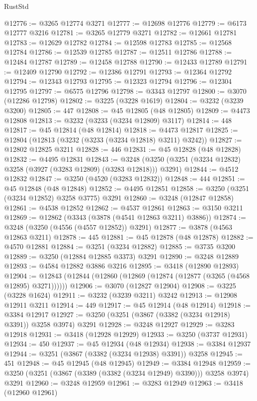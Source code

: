 \begin{lexlean}{RustStd}
\begin{coremodule}
@12776 := @3265 @12774 @3271
@12777 := @12698 @12776
@12779 := @6173 @12777 @3216
@12781 := @3265 @12779 @3271
@12782 := @12661 @12781
@12783 := @12629 @12782
@12784 := @12598 @12783
@12785 := @12568 @12784
@12786 := @12539 @12785
@12787 := @12511 @12786
@12788 := @12484 @12787
@12789 := @12458 @12788
@12790 := @12433 @12789
@12791 := @12409 @12790
@12792 := @12386 @12791
@12793 := @12364 @12792
@12794 := @12343 @12793
@12795 := @12323 @12794
@12796 := @12304 @12795
@12797 := @6575 @12796
@12798 := @3343 @12797
@12800 := @3070 (@12286 @12798)
@12802 := @3225 (@3228 @1619)
@12804 := @3232 (@3239 @3200)
@12805 := 447
@12808 := @45 @12805 (@48 @12805)
@12809 := @4473 @12808
@12813 := @3232 (@3233 (@3234 @12809) @3117)
@12814 := 448
@12817 := @45 @12814 (@48 @12814)
@12818 := @4473 @12817
@12825 := @12804 (@12813 (@3232 (@3233 (@3234 @12818) @3211) @3242))
@12827 := @12802 @12825 @3211
@12828 := 446
@12831 := @45 @12828 (@48 @12828)
@12832 := @4495 @12831
@12843 := @3248 (@3250 (@3251 (@3234 @12832) @3258 (@3927 (@3283 @12809) (@3283 @12818))) @3291)
@12844 := @4512 @12832
@12847 := @3250 (@4520 (@3283 @12832))
@12848 := 444
@12851 := @45 @12848 (@48 @12848)
@12852 := @4495 @12851
@12858 := @3250 (@3251 (@3234 @12852) @3258 @3775) @3291
@12860 := @3248 (@12847 @12858)
@12861 := @4538 @12852
@12862 := @4537 @12861
@12863 := @3150 @3211
@12869 := @12862 (@3343 (@3878 (@4541 @12863 @3211) @3886))
@12874 := @3248 (@3250 (@4556 (@4557 @12852)) @3291)
@12877 := @3878 (@4563 @12863 @3211)
@12878 := 445
@12881 := @45 @12878 (@48 @12878)
@12882 := @4570 @12881
@12884 := @3251 (@3234 @12882)
@12885 := @3735 @3200
@12889 := @3250 (@12884 @12885 @3373) @3291
@12890 := @3248 @12889
@12893 := @4584 @12882 @3886 @3216
@12895 := @3418 (@12890 @12893)
@12904 := @12843 (@12844 (@12860 (@12869 (@12874 (@12877 (@3265 (@4568 @12895) @3271))))))
@12906 := @3070 (@12827 @12904)
@12908 := @3225 (@3228 @1624)
@12911 := @3232 (@3239 @3211) @3242
@12913 := @12908 @12911 @3211
@12914 := 449
@12917 := @45 @12914 (@48 @12914)
@12918 := @3384 @12917
@12927 := @3250 (@3251 (@3867 (@3382 (@3234 @12918) @3391)) @3258 @3974) @3291
@12928 := @3248 @12927
@12929 := @3283 @12918
@12931 := @3418 (@12928 @12929)
@12933 := @3250 (@3737 @12931)
@12934 := 450
@12937 := @45 @12934 (@48 @12934)
@12938 := @3384 @12937
@12944 := @3251 (@3867 (@3382 (@3234 @12938) @3391)) @3258
@12945 := 451
@12948 := @45 @12945 (@48 @12945)
@12949 := @3384 @12948
@12959 := @3250 (@3251 (@3867 (@3389 (@3382 (@3234 @12949) @3390))) @3258 @3974) @3291
@12960 := @3248 @12959
@12961 := @3283 @12949
@12963 := @3418 (@12960 @12961)

\end{coremodule}
\end{lexlean}
